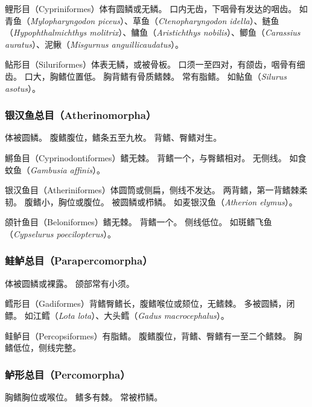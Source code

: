 \documentclass[11pt]{article}
\begin{document}
\newline

鲤形目（Cypriniformes）体有圆鳞或无鳞。
口内无齿，下咽骨有发达的咽齿。
如青鱼（\textit{Mylopharyngodon piceus}）、草鱼（\textit{Ctenopharyngodon idella}）、鲢鱼（\textit{Hypophthalmichthys molitrix}）、鳙鱼（\textit{Aristichthys nobilis}）、鲫鱼（\textit{Carassius auratus}）、泥鳅（\textit{Misgurnus anguillicaudatus}）。

\newline

鲇形目（Siluriformes）体表无鳞，或被骨板。
口须一至四对，有颌齿，咽骨有细齿。
口大，胸鳍位置低。
胸背鳍有骨质鳍棘。
常有脂鳍。
如鲇鱼（\textit{Silurus asotus}）。

\subsubsection{银汉鱼总目（Atherinomorpha）}
体被圆鳞。
腹鳍腹位，鳍条五至九枚。
背鳍、臀鳍对生。

\newline

鱂鱼目（Cyprinodontiformes）鳍无棘。
背鳍一个，与臀鳍相对。
无侧线。
如食蚊鱼（\textit{Gambusia affinis}）。

\newline

银汉鱼目（Atheriniformes）体圆筒或侧扁，侧线不发达。
两背鳍，第一背鳍棘柔韧。
腹鳍小，胸位或腹位。
被圆鳞或栉鳞。
如麦银汉鱼（\textit{Atherion elymus}）。

\newline

颌针鱼目（Beloniformes）鳍无棘。
背鳍一个。
侧线低位。
如斑鳍飞鱼（\textit{Cypselurus poecilopterus}）。

\subsubsection{鲑鲈总目（Parapercomorpha）}
体被圆鳞或裸露。
颌部常有小须。

\newline

鳕形目（Gadiformes）背鳍臀鳍长，腹鳍喉位或颏位，无鳍棘。
多被圆鳞，闭鳔。
如江鳕（\textit{Lota lota}）、大头鳕（\textit{Gadus macrocephalus}）。

\newline

鲑鲈目（Percopsiformes）有脂鳍。
腹鳍腹位，背鳍、臀鳍有一至二个鳍棘。
胸鳍低位，侧线完整。

\subsubsection{鲈形总目（Percomorpha）}
胸鳍胸位或喉位。
鳍多有棘。
常被栉鳞。
\end{document}
